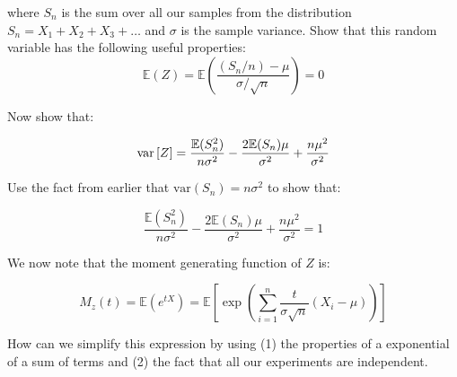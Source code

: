 \documentclass[paper=a4, fontsize=11pt]{scrartcl}
\numberwithin{equation}{section}
\numberwithin{figure}{section}
\numberwithin{table}{section}
\newcommand{\var}[1]{\ensuremath{{\rm var}\left[ #1 \right]}}
\begin{document}
\noindent where $S_n$ is the sum over all our samples from the distribution $S_n = X_1 + X_2 + X_3 + \dots$ and $\sigma$ is the sample variance.  Show that this
random variable has the following useful properties:
%
\begin{equation}
 \mathbb{E}(Z) = \mathbb{E}\left( \frac{(S_n/n) - \mu}{\sigma/\sqrt{n}} \right)
= 0
\nonumber
\end{equation}

\vspace{5cm}

%
Now show that: 

\begin{equation}
 \var{Z} = \frac{\mathbb{E}(S_n^2)}{n\sigma^2 } - \frac{2\mathbb{E}(S_n)\mu}{\sigma^2} + \frac{ n\mu^2 }{\sigma^2}
\end{equation}

\vspace{5cm}

%
Use the fact from earlier that $\textrm{var}(S_n)=n\sigma^2$ to show that:

\begin{equation}
 \frac{\mathbb{E}(S_n^2)}{n\sigma^2 } - \frac{2\mathbb{E}(S_n)\mu}{\sigma^2} +
\frac{n\mu^2}{\sigma^2} = 1
\end{equation}

\noindent We now note that the moment generating function of $Z$ is:

\begin{equation}
 M_z(t) = \mathbb{E}(e^{tX}) = \mathbb{E}\left[ \exp\left( \sum_{i=1}^n
\frac{t}{\sigma\sqrt{n}} (X_i-\mu) \right) \right]
\end{equation}

\noindent How can we simplify this expression by using (1) the properties of a
exponential of a sum of terms and (2) the fact that all our experiments are
independent.

\begin{questions}
\vspace{5cm}
\end{questions}
\end{document}
